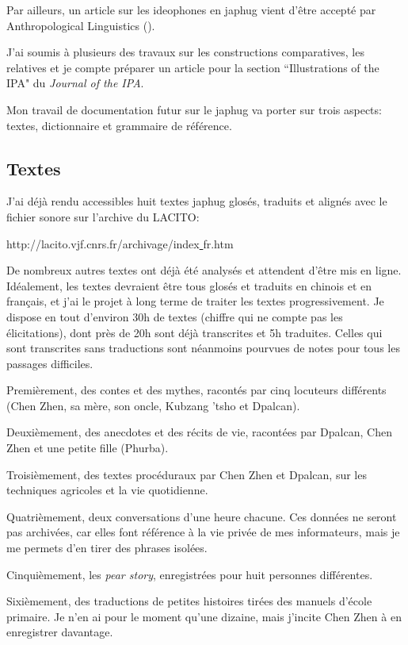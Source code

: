 \documentclass[oldfontcommands,oneside,a4paper,11pt]{memoir}
\begin{document}
	Par ailleurs, un article sur les ideophones en japhug vient d'être accepté par Anthropological Linguistics (\citealt{japhug14ideophones}).
	
	J'ai soumis à plusieurs des travaux sur les constructions comparatives, les relatives et je compte préparer un article pour la section ``Illustrations of the IPA" du \textit{Journal of the IPA}.
	
	Mon travail de documentation futur sur le japhug va porter sur trois aspects:  textes,  dictionnaire et grammaire de référence.
	
\subsection{Textes}
J’ai déjà rendu accessibles huit textes japhug glosés, traduits et alignés avec le fichier sonore sur l’archive du LACITO:
	
	{http://lacito.vjf.cnrs.fr/archivage/index{\underline{  }}fr.htm}
	
De nombreux autres textes ont déjà été analysés et attendent d’être mis en ligne. Idéalement, les textes devraient être tous glosés et traduits en chinois et en français, et j'ai le projet à long terme de traiter les textes progressivement.   Je dispose en tout d'environ 30h de textes (chiffre qui ne compte pas les élicitations), dont près de 20h sont déjà transcrites et 5h traduites. Celles qui sont transcrites sans traductions sont néanmoins pourvues de notes pour tous les passages difficiles.


Premièrement, des contes et des mythes, racontés par cinq locuteurs différents (Chen Zhen, sa mère, son oncle, Kubzang 'tsho et Dpalcan).

Deuxièmement, des anecdotes et des récits de vie, racontées par Dpalcan, Chen Zhen et une petite fille (Phurba).

Troisièmement, des textes procéduraux par Chen Zhen et Dpalcan, sur les techniques agricoles et la vie quotidienne.

Quatrièmement, deux conversations d'une heure chacune. Ces données ne seront pas archivées, car elles font référence à la vie privée de mes informateurs, mais je me permets d'en tirer des phrases isolées.

Cinquièmement, les \textit{pear story}, enregistrées pour huit personnes différentes.  

Sixièmement, des traductions de petites histoires tirées des manuels d'école primaire. Je n'en ai pour le moment qu'une dizaine, mais j'incite Chen Zhen à en enregistrer davantage.
	
\end{document}
